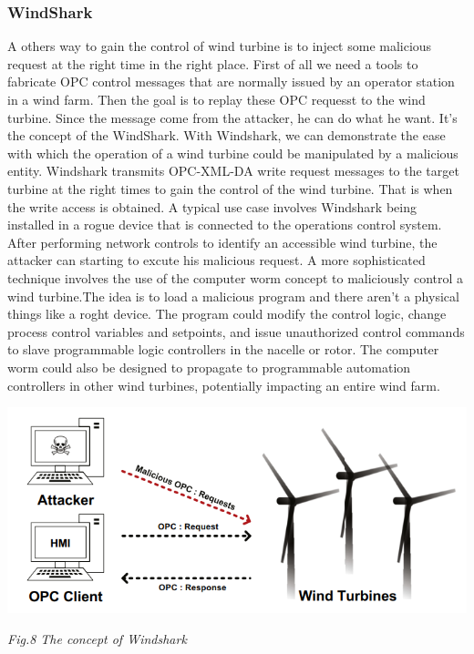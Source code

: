 \documentclass[twosided,a4,10pt]{article}
\begin{document}
\begin{multicols}{2}
\subsubsection{WindShark}
A others way to gain the control of wind turbine is to inject some malicious request at the right time in the right place. First of all we need a tools to fabricate OPC control messages that are normally issued by an operator station in a wind farm. Then the goal is to replay these OPC requesst to the wind turbine. Since the message come from the attacker, he can do what he want. It's the concept of the WindShark. With Windshark, we can demonstrate the ease with which the operation of a wind turbine could be manipulated by a malicious entity. Windshark transmits OPC-XML-DA write request messages to the target turbine at the right times to gain the control of the wind turbine. That is when the write access is obtained. \newline
A typical use case involves Windshark being installed in a rogue device that is connected to the operations control system. After performing network controls to identify an accessible wind turbine, the attacker can starting to excute his malicious request. A more sophisticated technique involves the use of the computer worm concept to maliciously control a wind turbine.The idea is to load a malicious program and there aren't a physical things like a roght device. The program could modify the control logic, change process control variables and setpoints, and issue unauthorized control commands to slave programmable logic controllers in the nacelle or rotor. The computer worm could also be designed to propagate to programmable automation controllers in other wind turbines, potentially impacting an entire wind farm.


\includegraphics[scale=0.5]{Windshark}
\begin{center}
	\textit{Fig.8 The concept of Windshark}
\end{center}


\end{multicols}
\end{document}

